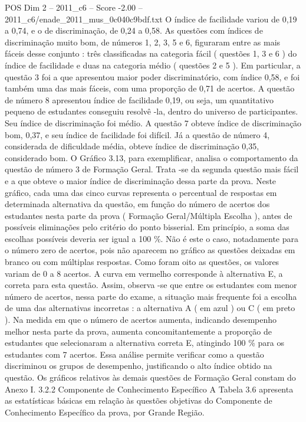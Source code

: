 \begin{textsample}{POS Dim 2 – 2011\_c6 – Score -2.00 – 2011\_c6/enade\_2011\_mus\_0c040c9bdf.txt}
O índice de facilidade variou de 0,19 a 0,74, e o de discriminação, de 0,24 a 0,58.
As questões com índices de discriminação muito bom, de números 1, 2, 3, 5 e 6, figuraram entre as mais fáceis desse conjunto : três classificadas na categoria fácil ( questões 1, 3 e 6 ) do índice de facilidade e duas na categoria médio ( questões 2 e 5 ).
Em particular, a questão 3 foi a que apresentou maior poder discriminatório, com índice 0,58, e foi também uma das mais fáceis, com uma proporção de 0,71 de acertos.
A questão de número 8 apresentou índice de facilidade 0,19, ou seja, um quantitativo pequeno de estudantes conseguiu resolvê -la, dentro do universo de participantes.
Seu índice de discriminação foi médio.
A questão 7 obteve índice de discriminação bom, 0,37, e seu índice de facilidade foi difícil.
Já a questão de número 4, considerada de dificuldade média, obteve índice de discriminação 0,35, considerado bom.
O Gráfico 3.13, para exemplificar, analisa o comportamento da questão de número 3 de Formação Geral.
Trata -se da segunda questão mais fácil e a que obteve o maior índice de discriminação dessa parte da prova.
Neste gráfico, cada uma das cinco curvas representa o percentual de respostas em determinada alternativa da questão, em função do número de acertos dos estudantes nesta parte da prova ( Formação Geral/Múltipla Escolha ), antes de possíveis eliminações pelo critério do ponto bisserial.
Em princípio, a soma das escolhas possíveis deveria ser igual a 100 \%.
Não é este o caso, notadamente para o número zero de acertos, pois não aparecem no gráfico as questões deixadas em branco ou com múltiplas respostas.
Como foram oito as questões, os valores variam de 0 a 8 acertos.
A curva em vermelho corresponde à alternativa E, a correta para esta questão.
Assim, observa -se que entre os estudantes com menor número de acertos, nessa parte do exame, a situação mais frequente foi a escolha de uma das alternativas incorretas : a alternativa A ( em azul ) ou C ( em preto ).
Na medida em que o número de acertos aumenta, indicando desempenho melhor nesta parte da prova, aumenta concomitantemente a proporção de estudantes que selecionaram a alternativa correta E, atingindo 100 \% para os estudantes com 7 acertos.
Essa análise permite verificar como a questão discriminou os grupos de desempenho, justificando o alto índice obtido na questão.
Os gráficos relativos às demais questões de Formação Geral constam do Anexo I. 3.2.2 Componente de Conhecimento Específico A Tabela 3.6 apresenta as estatísticas básicas em relação às questões objetivas do Componente de Conhecimento Específico da prova, por Grande Região.

\end{textsample}
